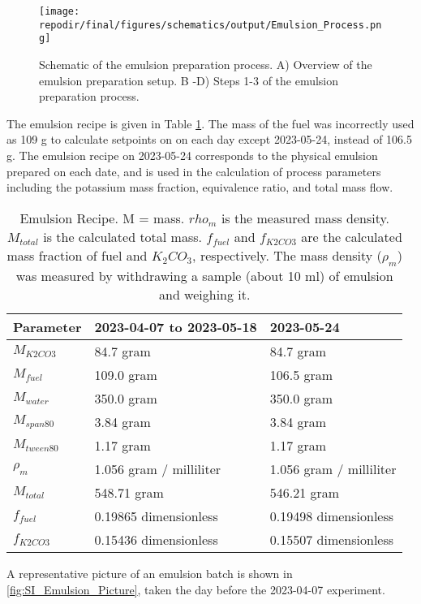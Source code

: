 \begin{figure}[]
\centering
\texttt{[image: \\repodir/final/figures/schematics/output/Emulsion\_Process.png]}
\caption{Schematic of the emulsion preparation process. A) Overview of the emulsion preparation setup. B -D) Steps 1-3 of the emulsion preparation process.}
\label{fig:SI_Emulsion_Process}
\end{figure}


The emulsion recipe is given in Table \ref{tab:emulsion_parameters}. The mass of the fuel was incorrectly used as 109 g to calculate setpoints on on each day except 2023-05-24, instead of 106.5 g. The emulsion recipe on 2023-05-24 corresponds to the physical emulsion prepared on each date, and is used in the calculation of process parameters including the potassium mass fraction, equivalence ratio, and total mass flow. 


\begin{table}[h]
\centering
\begin{tabular}{|l|l|l|}
\hline
\textbf{Parameter} & \textbf{2023-04-07 to 2023-05-18} & \textbf{2023-05-24} \\
\hline
$M_{K2CO3}$ & 84.7 gram & 84.7 gram \\
$M_{fuel}$ & 109.0 gram & 106.5 gram \\
$M_{water}$ & 350.0 gram & 350.0 gram \\
$M_{span80}$ & 3.84 gram & 3.84 gram \\
$M_{tween80}$ & 1.17 gram & 1.17 gram \\
$\rho_m$ & 1.056 gram / milliliter & 1.056 gram / milliliter \\
$M_{total}$ & 548.71 gram & 546.21 gram \\
$f_{fuel}$ & 0.19865 dimensionless & 0.19498 dimensionless \\
$f_{K2CO3}$ & 0.15436 dimensionless & 0.15507 dimensionless \\
\hline
\end{tabular}
\caption{Emulsion Recipe. M = mass. $rho_m$ is the measured mass density. $M_{total}$ is the calculated total mass. $f_{fuel}$ and $f_{K2CO3}$ are the calculated mass fraction of fuel and $K_2CO_3$, respectively. The mass density ($\rho_m$) was measured by withdrawing a sample (about 10 ml) of emulsion and weighing it.  }


\label{tab:emulsion_parameters}
\end{table}
A representative picture of an emulsion batch is shown in \ref{fig:SI_Emulsion_Picture}, taken the day before the 2023-04-07 experiment. 

